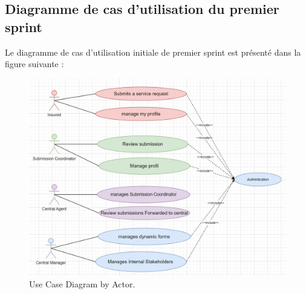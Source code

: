 \subsection{Diagramme de cas d’utilisation du premier sprint}
Le diagramme de cas d’utilisation initiale de premier sprint est présenté dans la figure suivante :
\begin{figure}[h]
    \centering
    \includegraphics[width=1\textwidth]{figures/sprint1 use case.jpg}
    \caption{Use Case Diagram by Actor.}
\end{figure}
\clearpage
